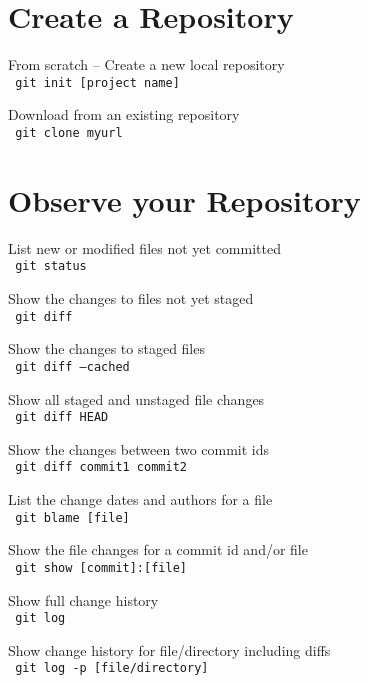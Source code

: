 \documentclass[a4paper, twoside, 11pt]{extarticle}
\begin{document}
\renewcommand{\footrulewidth}{0.4pt}

\begin{multicols*}{2}
\section{Create a Repository}
From scratch -- Create a new local repository \\ \texttt{\color{blue} git init [project name]}

Download from an existing repository \\ \texttt{\color{blue} git clone myurl}

\section{Observe your Repository}
List new or modified files not yet
committed \\ \texttt{\color{blue} git status}

Show the changes to files not yet staged \\ \texttt{\color{blue} git diff}

Show the changes to staged files \\ \texttt{\color{blue} git diff --cached}

Show all staged and unstaged
file changes \\ \texttt{\color{blue} git diff HEAD}

Show the changes between two
commit ids \\ \texttt{\color{blue} git diff commit1 commit2}

List the change dates and authors
for a file \\ \texttt{\color{blue} git blame [file]}

Show the file changes for a commit
id and/or file \\ \texttt{\color{blue} git show [commit]:[file]}

Show full change history \\ \texttt{\color{blue} git log}

Show change history for file/directory
including diffs \\ \texttt{\color{blue} git log -p [file/directory]}



\end{multicols*}
\end{document}
